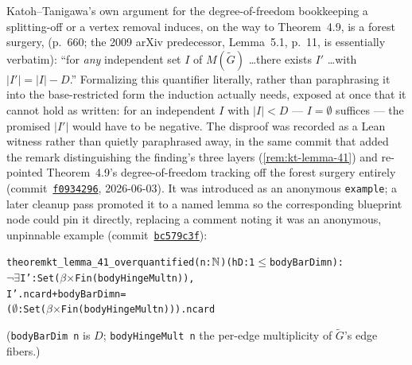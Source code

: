 Katoh--Tanigawa's own argument for the degree-of-freedom bookkeeping a
splitting-off or a vertex removal induces, on the way to Theorem~4.9, is a
forest surgery, \cite[Lemma 4.1]{katohTanigawa2011} (p.~660; the 2009 arXiv
predecessor, Lemma~5.1, p.~11, is essentially verbatim): ``for \emph{any}
independent set $I$ of $M(\tilde G)$ \dots there exists $I'$ \dots with
$|I'| = |I| - D$.'' Formalizing this quantifier literally, rather than
paraphrasing it into the base-restricted form the induction actually needs,
exposed at once that it cannot hold as written: for an independent $I$ with
$|I| < D$ --- $I = \emptyset$ suffices --- the promised $|I'|$ would have to
be negative. The disproof was recorded as a Lean witness rather than quietly
paraphrased away, in the same commit that added the remark distinguishing
the finding's three layers (\cref{rem:kt-lemma-41}) and re-pointed
Theorem~4.9's degree-of-freedom tracking off the forest surgery entirely
(commit~\href{https://github.com/bryangingechen/CombinatorialRigidity/commit/f0934296677f6e0e535394c5400ca3645db53e34}{\texttt{f0934296}},
2026-06-03). It was introduced as an anonymous \texttt{example}; a later
cleanup pass promoted it to a named lemma so the corresponding blueprint node
could pin it directly, replacing a comment noting it was an anonymous,
unpinnable example
(commit~\href{https://github.com/bryangingechen/CombinatorialRigidity/commit/bc579c3f753c90d645699863308db2f8ce1d3929}{\texttt{bc579c3f}}):
\begin{alltt}
theorem kt_lemma_41_overquantified (n : \(\N\)) (hD : 1 \(\le\) bodyBarDim n) :
    \(\neg\) \(\exists\) I' : Set (\(\beta\) \(\times\) Fin (bodyHingeMult n)),
      I'.ncard + bodyBarDim n =
        (\(\emptyset\) : Set (\(\beta\) \(\times\) Fin (bodyHingeMult n))).ncard
\end{alltt}
(\texttt{bodyBarDim n} is $D$; \texttt{bodyHingeMult n} the per-edge
multiplicity of $\tilde G$'s edge fibers.)

